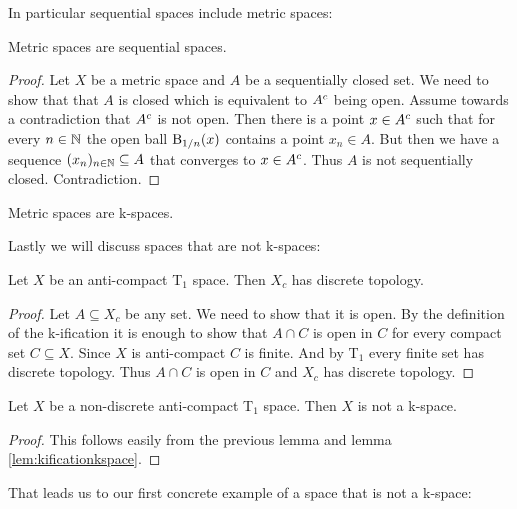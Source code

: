In particular sequential spaces include metric spaces: 

\begin{lem}
    Metric spaces are sequential spaces.
\end{lem}
\begin{proof}
    Let $X$ be a metric space and $A$ be a sequentially closed set. 
    We need to show that that $A$ is closed which is equivalent to $A^{c}$ being open.
    Assume towards a contradiction that $A^{c}$ is not open. 
    Then there is a point $x \in A^{c}$ such that for every $n \in \mathbb{N}$ the open ball $\text{B}_{1/n}(x)$ contains a point $x_n \in A$. 
    But then we have a sequence $(x_n)_{n \in \mathbb{N}} \subseteq A$ that converges to $x \in A^{c}$. Thus $A$ is not sequentially closed. Contradiction. 
\end{proof}

\begin{cor}
    Metric spaces are k-spaces.
\end{cor}

Lastly we will discuss spaces that are not k-spaces:

\begin{lem}
    Let $X$ be an anti-compact T$_1$ space.
    Then $X_c$ has discrete topology.
\end{lem}
\begin{proof}
    Let $A \subseteq X_c$ be any set. We need to show that it is open. 
    By the definition of the k-ification it is enough to show that $A \cap C$
    is open in $C$ for every compact set $C \subseteq X$. 
    Since $X$ is anti-compact $C$ is finite.
    And by T$_1$ every finite set has discrete topology. 
    Thus $A \cap C$ is open in $C$ and $X_c$ has discrete topology.
\end{proof}

\begin{cor}
    Let $X$ be a non-discrete anti-compact T$_1$ space.
    Then $X$ is not a k-space.
\end{cor}
\begin{proof}
    This follows easily from the previous lemma and lemma \ref{lem:kificationkspace}.
\end{proof}

That leads us to our first concrete example of a space that is not a k-space: 

